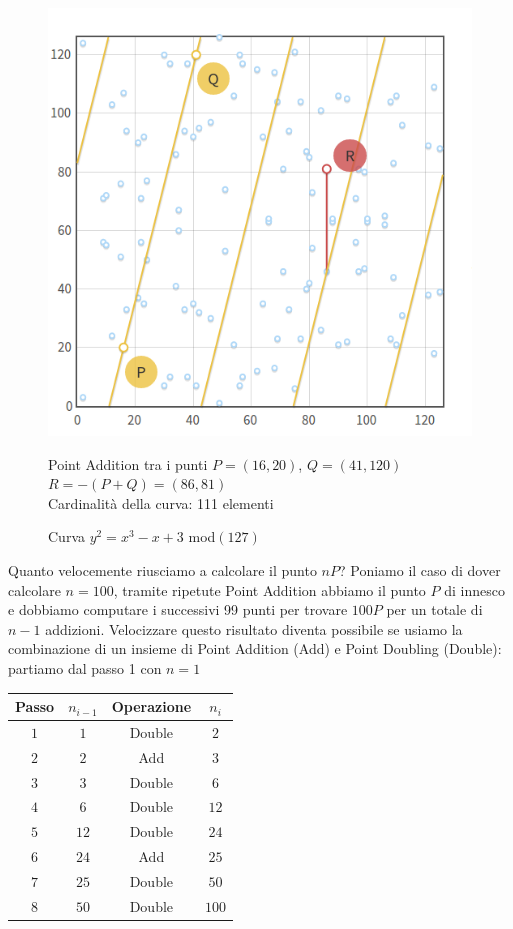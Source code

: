 \documentclass[a4paper,12pt]{tesiinfo}
\begin{document}
\begin{figure}[H]
 \includegraphics[width=.7\textwidth,center]{ECmodPA}
 \caption{Curva $y^2=x^3-x+3$ mod$(127)$}
 \begin{center}
  Point Addition tra i punti $P = (16, 20)$, $Q=(41, 120)$\\
  $R = -(P+Q) = (86, 81)$\\
  Cardinalit\`a della curva: 111 elementi
 \end{center}
  \label{ECmodPA}
\end{figure}
Quanto velocemente riusciamo a calcolare il punto $nP$? Poniamo il caso di dover calcolare $n=100$, tramite ripetute Point Addition abbiamo il punto $P$ di innesco e dobbiamo computare i successivi 99 punti per trovare $100P$ per un totale di $n-1$ addizioni. Velocizzare questo risultato diventa possibile se usiamo la combinazione di un insieme di Point Addition (Add) e Point Doubling (Double): partiamo dal passo 1 con $n=1$
\begin{center}
\begin{tabular}{ c | c c c }
 Passo & $n_{i-1}$ & Operazione & $n_i$\\
 \hline
 $1$ &$1$ & Double &$2$\\
 $2$ &$2$ & Add &$3$\\
 $3$ &$3$ & Double &$6$\\
 $4$ &$6$ & Double &$12$\\
 $5$ &$12$ & Double &$24$\\
 $6$ &$24$ & Add &$25$\\
 $7$ &$25$ & Double &$50$\\
 $8$ &$50$ & Double &$100$\\
\end{tabular}
\end{center}
\end{document}
